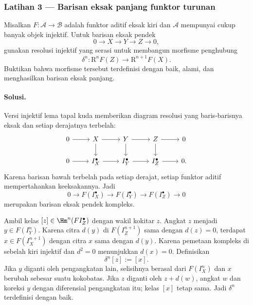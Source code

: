 \subsubsection*{Latihan 3 --- Barisan eksak panjang funktor turunan}
\hypertarget{o014.mastery.derived-spectral.002.ex03}{ }
\label{mastery:derived-spectral-002-ex03}

Misalkan $F:\mathcal{A}\to\mathcal{B}$ adalah funktor aditif eksak kiri dan
$\mathcal{A}$ mempunyai cukup banyak objek injektif. Untuk barisan eksak
pendek
\[
	0\longrightarrow X\longrightarrow Y\longrightarrow Z\longrightarrow0,
\]
gunakan resolusi injektif yang serasi untuk membangun morfisme penghubung
\[
	\delta^n:\mathrm{R}^nF(Z)\longrightarrow\mathrm{R}^{n+1}F(X).
\]
Buktikan bahwa morfisme tersebut terdefinisi dengan baik, alami, dan menghasilkan
barisan eksak panjang.

\paragraph{Solusi.}
\hypertarget{o014.mastery.derived-spectral.002.sol03}{ }
Versi injektif lema tapal kuda memberikan diagram resolusi yang baris-barisnya
eksak dan setiap derajatnya terbelah:
\[
\begin{tikzcd}
	0 \arrow[r] & X \arrow[r] \arrow[d] & Y \arrow[r] \arrow[d] & Z \arrow[r] \arrow[d] & 0 \\
	0 \arrow[r] & I_X^\bullet \arrow[r] & I_Y^\bullet \arrow[r] & I_Z^\bullet \arrow[r] & 0.
\end{tikzcd}
\]
Karena barisan bawah terbelah pada setiap derajat, setiap funktor aditif
mempertahankan keeksakannya. Jadi
\[
	0\to F(I_X^\bullet)\to F(I_Y^\bullet)
	\to F(I_Z^\bullet)\to0
\]
merupakan barisan eksak pendek kompleks.

Ambil kelas $[z]\in\Hm^n(FI_Z^\bullet)$ dengan wakil kokitar $z$.
Angkat $z$ menjadi $y\in F(I_Y^n)$. Karena citra $d(y)$ di
$F(I_Z^{n+1})$ sama dengan $d(z)=0$, terdapat $x\in F(I_X^{n+1})$ dengan
citra $x$ sama dengan $d(y)$. Karena pemetaan kompleks di sebelah kiri injektif dan
$d^2=0$ menunjukkan $d(x)=0$. Definisikan
\[
	\delta^n[z]:=[x].
\]
Jika $y$ diganti oleh pengangkatan lain, selisihnya berasal dari
$F(I_X^n)$ dan $x$ berubah sebesar suatu kokobatas. Jika $z$ diganti oleh
$z+d(w)$, angkat $w$ dan koreksi $y$ dengan diferensial pengangkatan itu;
kelas $[x]$ tetap sama. Jadi $\delta^n$ terdefinisi dengan baik.


